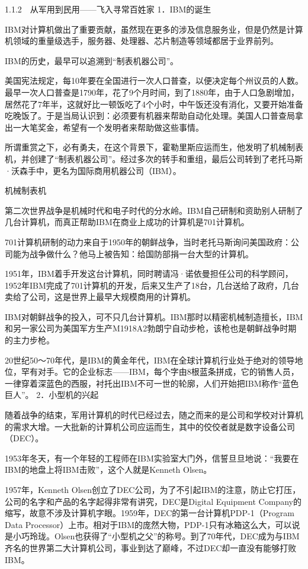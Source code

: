 \documentclass[12pt,UTF8]{ctexbook}
\begin{document}
1.1.2　从军用到民用——飞入寻常百姓家
1．IBM的诞生

IBM对计算机做出了重要贡献，虽然现在更多的涉及信息服务业，但是仍然是计算机领域的重量级选手，服务器、处理器、芯片制造等领域都居于业界前列。

IBM的历史，最早可以追溯到“制表机器公司”。

美国宪法规定，每10年要在全国进行一次人口普查，以便决定每个州议员的人数。最早一次人口普查是1790年，花了9个月时间，到了1880年，由于人口急剧增加，居然花了7年半，这就好比一顿饭吃了4个小时，中午饭还没有消化，又要开始准备吃晚饭了。于是当局认识到：必须要有机器来帮助自动化处理。美国人口普查局拿出一大笔奖金，希望有一个发明者来帮助做这些事情。

所谓重赏之下，必有勇夫，在这个背景下，霍勒里斯应运而生，他发明了机械制表机，并创建了“制表机器公司”。经过多次的转手和重组，最后公司转到了老托马斯·沃森手中，更名为国际商用机器公司（IBM）。

机械制表机

第二次世界战争是机械时代和电子时代的分水岭。IBM自己研制和资助别人研制了几台计算机，而真正帮助IBM在商业上成功的计算机是701计算机。

701计算机研制的动力来自于1950年的朝鲜战争，当时老托马斯询问美国政府：公司能为战争做什么？他马上被告知：给国防部捐一台大型的计算机。

1951年，IBM着手开发这台计算机，同时聘请冯·诺依曼担任公司的科学顾问，1952年IBM完成了701计算机的开发，后来又生产了18台，几台送给了政府，几台卖给了公司，这是世界上最早大规模商用的计算机。

IBM对朝鲜战争的投入，可不只几台计算机。IBM那时以精密机械制造擅长，IBM和另一家公司为美国军方生产M1918A2勃朗宁自动步枪，该枪也是朝鲜战争时期的主力步枪。

20世纪50～70年代，是IBM的黄金年代，IBM在全球计算机行业处于绝对的领导地位，罕有对手。它的企业标志——IBM，每个字由8根蓝条拼成，它的销售人员，一律穿着深蓝色的西服，衬托出IBM不可一世的轮廓，人们开始把IBM称作“蓝色巨人”。
2．小型机的兴起

随着战争的结束，军用计算机的时代已经过去，随之而来的是公司和学校对计算机的需求大增。一大批新的计算机公司应运而生，其中的佼佼者就是数字设备公司（DEC）。

1953年冬天，有一个年轻的工程师在IBM实验室大门外，信誓旦旦地说：“我要在IBM的地盘上将IBM击败”，这个人就是Kenneth Olsen。

1957年，Kenneth Olsen创立了DEC公司，为了不引起IBM的注意，防止它打压，公司的名字和产品的名字起得非常有讲究，DEC是Digital Equipment Company的缩写，故意不涉及计算机字眼。1959年，DEC的第一台计算机PDP-1（Program Data Processor）上市。相对于IBM的庞然大物，PDP-1只有冰箱这么大，可以说是小巧玲珑。Olsen也获得了“小型机之父”的称号。到了70年代，DEC成为与IBM齐名的世界第二大计算机公司，事业到达了巅峰，不过DEC却一直没有能够打败IBM。
\end{document}
